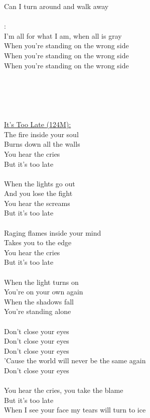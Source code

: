 \documentclass[11pt]{article}
\begin{document}
Can I turn around and walk away\\
\\
[Chorus]:\\
I'm all for what I am, when all is gray\\
When you're standing on the wrong side\\
When you're standing on the wrong side\\
When you're standing on the wrong side\\
\\
[Solo]\\
\\
[Chorus]\\
\\
\underline{It’s Too Late (124M):}\\
The fire inside your soul\\
Burns down all the walls\\
You hear the cries\\
But it's too late\\
\\
When the lights go out\\
And you lose the fight\\
You hear the screams\\
But it's too late\\
\\
Raging flames inside your mind\\
Takes you to the edge\\
You hear the cries\\
But it's too late\\
\\
When the light turns on\\
You're on your own again\\
When the shadows fall\\
You're standing alone\\
\\
Don't close your eyes\\
Don't close your eyes\\
Don't close your eyes\\
'Cause the world will never be the same again\\
Don't close your eyes\\
\\
You hear the cries, you take the blame\\
But it's too late\\
When I see your face my tears will turn to ice\\
\end{document}
